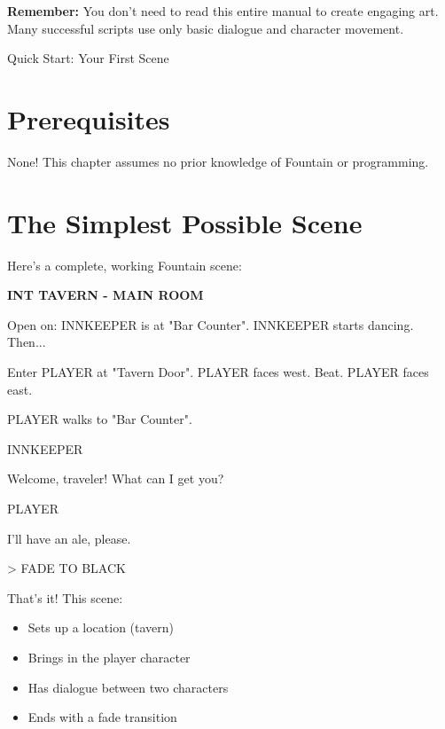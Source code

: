 \documentclass[11pt,letterpaper,oldstylefigures]{memoir}
\makeatletter
\newcommand{\slugline}[1]{\nobreak\textbf{\MakeUppercase{#1}}\par\nobreak\vspace{1\baselineskip}}
\newcommand{\speaker}[1]{\nobreak\hspace*{0.333\textwidth}\MakeUppercase{#1}\par\nobreak\vspace{0.5\baselineskip}}
\newcommand{\dialogue}[1]{\nobreak\hspace*{0.25\textwidth}\begin{minipage}{0.5\textwidth}#1\end{minipage}\par\vspace{1\baselineskip}}
\newcommand{\stagedir}[1]{#1\par\vspace{1\baselineskip}}
\newenvironment{FountainExample}
  {\begingroup
  \ttfamily\small
   \setlength{\parindent}{0pt}
  \setlength{\parskip}{0.5em}
  \allowdisplaybreaks
  \setlength{\displaywidowpenalty}{0}
  \setlength{\widowpenalty}{0}
  \setlength{\clubpenalty}{0}
  \setlength{\interlinepenalty}{0}
}
  {\endgroup}
\newcommand{\sceneendcmd}[1]{\begin{flushright}\ttfamily #1\end{flushright}}
\let\oldchapter\chapter
\def\chapter{%
  \@ifstar
    {\FountainScripting@starchapter}%
    {\@dblarg\FountainScripting@chapter}}
\def\FountainScripting@starchapter#1{\oldchapter*{#1}\chaptermark{#1}}
\def\FountainScripting@chapter[#1]#2{\oldchapter[#1]{#2}\chaptermark{#2}}
\newcommand{\sectionbreak}{\newpage}
\makeatother
\begin{document}
\textbf{Remember:} You don't need to read this entire manual to create engaging art. Many successful scripts use only basic dialogue and character movement.

\sectionbreak

\tableofcontents
\clearpage

\mainmatter
\pagestyle{headings}
\normalfont


\chapter{Quick Start: Your First Scene}
\label{ch:quickstart}

\section{Prerequisites}
None! This chapter assumes no prior knowledge of Fountain or programming.

\section{The Simplest Possible Scene}

Here's a complete, working Fountain scene:

\begin{FountainExample}
\slugline{INT TAVERN - MAIN ROOM}

\stagedir{Open on: INNKEEPER is at "Bar Counter". INNKEEPER starts dancing. Then...}
\stagedir{Enter PLAYER at "Tavern Door". PLAYER faces west. Beat. PLAYER faces east.}

\stagedir{PLAYER walks to "Bar Counter".}

\speaker{INNKEEPER}
\dialogue{Welcome, traveler! What can I get you?}

\speaker{PLAYER}
\dialogue{I'll have an ale, please.}

\sceneendcmd{> FADE TO BLACK}
\end{FountainExample}

That's it! This scene:
\begin{itemize}
\item Sets up a location (tavern)
\item Brings in the player character
\item Has dialogue between two characters
\item Ends with a fade transition
\end{itemize}
\end{document}
